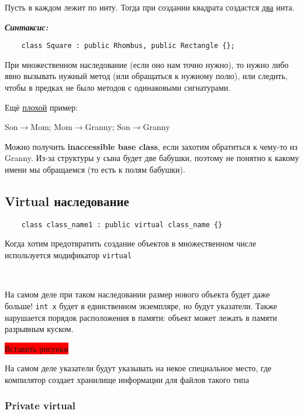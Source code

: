 \documentclass[12pt]{article}
\begin{document}
Пусть в каждом лежит по инту. Тогда при создании квадрата создастся \underline{два} инта. 

\textbf{\textit{Синтаксис:}}

\begin{lstlisting}
	class Square : public Rhombus, public Rectangle {};
\end{lstlisting}

При множественном наследование (если оно нам точно нужно), то нужно либо явно вызывать нужный метод (или обращаться к нужному полю), или следить, чтобы в предках не было  методов с одинаковыми сигнатурами. 

Ещё \underline{плохой} пример:

\begin{center}
	Son$\rightarrow$Mom; Mom$\rightarrow$Granny; Son$\rightarrow$Granny
\end{center}

Можно получить \textbf{inaccessible base class}, если захотим обратиться к чему-то из Granny. Из-за структуры у сына будет две бабушки, поэтому не понятно к какому имени мы обращаемся (то есть к полям бабушки). 

\subsection{Virtual наследование}

\begin{lstlisting}
	class class_name1 : public virtual class_name {}
\end{lstlisting}

Когда хотим предотвратить создание объектов в множественном числе используется модификатор \texttt{virtual}

\

На самом деле при таком наследовании размер нового объекта будет даже больше!
\texttt{int x} будет в единственном экземпляре, но будут указатели. 
Также нарушается порядок расположения в памяти: объект может лежать в памяти разрывным куском. 

\colorbox{red}{Вставить рисунки}

На самом деле указатели будут указывать на некое специальное место, где компилятор создает хранилище информации для файлов такого типа

\subsubsection{Private virtual}
\end{document}
